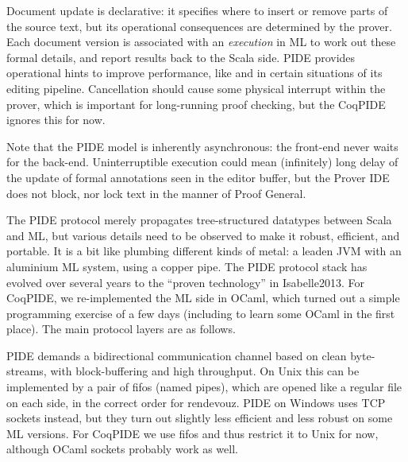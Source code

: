 \begin{isabellebody}
\begin{isamarkuptext}
  Document update is declarative: it specifies where to insert or
  remove parts of the source text, but its operational consequences
  are determined by the prover.  Each document version is associated
  with an \emph{execution} in ML to work out these formal details, and
  report results back to the Scala side.  PIDE provides operational
  hints to improve performance, like  and  in certain situations of its editing
  pipeline.  Cancellation should cause some physical interrupt within
  the prover, which is important for long-running proof checking, but
  the CoqPIDE ignores this for now.

  Note that the PIDE model is inherently asynchronous: the front-end
  never waits for the back-end.  Uninterruptible execution could mean
  (infinitely) long delay of the update of formal annotations seen in
  the editor buffer, but the Prover IDE does not block, nor lock text
  in the manner of Proof General.\end{isamarkuptext}\isamarkuptrue {}
\isamarkuptrue \begin{isamarkuptext}The PIDE protocol merely propagates tree-structured datatypes
  between Scala and ML, but various details need to be observed to
  make it robust, efficient, and portable.  It is a bit like plumbing
  different kinds of metal: a leaden JVM with an aluminium ML system,
  using a copper pipe.  The PIDE protocol stack has evolved over
  several years to the ``proven technology'' in Isabelle2013.  For
  CoqPIDE, we re-implemented the ML side in OCaml, which turned out a
  simple programming exercise of a few days (including to learn some
  OCaml in the first place).  The main protocol layers are as follows.

   PIDE demands a bidirectional
  communication channel based on clean byte-streams, with
  block-buffering and high throughput.  On Unix this can be
  implemented by a pair of fifos (named pipes), which are opened like
  a regular file on each side, in the correct order for rendevouz.
  PIDE on Windows uses TCP sockets instead, but they turn out slightly
  less efficient and less robust on some ML versions.  For CoqPIDE we
  use fifos and thus restrict it to Unix for now, although OCaml
  sockets probably work as well.


\end{isamarkuptext}
\end{isabellebody}

